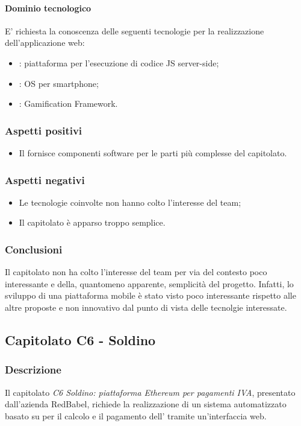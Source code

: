 			\paragraph{Dominio tecnologico} 
			E' richiesta la conoscenza delle seguenti tecnologie per la realizzazione dell'applicazione web:
				\begin{itemize}
					\item \textbf{}: piattaforma per l'esecuzione di codice JS server-side;
					\item \textbf{}: OS per smartphone;
					\item \textbf{}: Gamification Framework.
				\end{itemize}
		\subsubsection{Aspetti positivi}
		\begin{itemize}
			\item Il  fornisce componenti software per le parti più complesse del capitolato.
		\end{itemize}
		\subsubsection{Aspetti negativi}
		\begin{itemize}
			\item Le tecnologie coinvolte non hanno colto l'interesse del team;
			\item Il capitolato è apparso troppo semplice.
		\end{itemize}
		\subsubsection{Conclusioni}
		Il capitolato non ha colto l'interesse del team per via del contesto poco interessante e della, quantomeno apparente, semplicità del progetto. Infatti, lo 				sviluppo di una piattaforma mobile è stato visto poco interessante rispetto alle altre proposte e non innovativo dal punto di vista delle tecnolgie 					interessate. 
		
		
	\subsection{Capitolato C6 - Soldino}
		\subsubsection{Descrizione}
		Il capitolato \emph{C6 Soldino: piattaforma Ethereum per pagamenti IVA}, presentato dall'azienda RedBabel, richiede la realizzazione di un sistema automatizzato basato su  per il calcolo e il pagamento dell' tramite un'interfaccia web.
